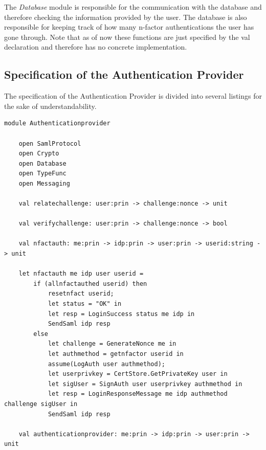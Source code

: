 \documentclass[twosided]{report}
\begin{document}
The \emph{Database} module is responsible for the communication with the database and therefore checking the information provided by the user. The database is also responsible for keeping track of how many n-factor authentications the user has gone through. Note that as of now these functions are just specified by the val declaration and therefore has no concrete implementation.

\clearpage
\subsection{Specification of the Authentication Provider}
The specification of the Authentication Provider is divided into several listings for the sake of understandability.

\begin{lstlisting}[style=fstar, caption={Specification of the authentication provider}]
	module Authenticationprovider

	open SamlProtocol
	open Crypto
	open Database
	open TypeFunc
	open Messaging

	val relatechallenge: user:prin -> challenge:nonce -> unit

	val verifychallenge: user:prin -> challenge:nonce -> bool

	val nfactauth: me:prin -> idp:prin -> user:prin -> userid:string -> unit

	let nfactauth me idp user userid =
		if (allnfactauthed userid) then
			resetnfact userid;
			let status = "OK" in
			let resp = LoginSuccess status me idp in
			SendSaml idp resp
		else
			let challenge = GenerateNonce me in
			let authmethod = getnfactor userid in
			assume(LogAuth user authmethod);
			let userprivkey = CertStore.GetPrivateKey user in
			let sigUser = SignAuth user userprivkey authmethod in
			let resp = LoginResponseMessage me idp authmethod challenge sigUser in
			SendSaml idp resp

	val authenticationprovider: me:prin -> idp:prin -> user:prin -> unit


\end{lstlisting}
\end{document}
